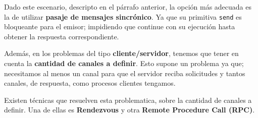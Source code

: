 \documentclass[a4paper, 10pt]{article}
\newenvironment{QandA}{
    \begin{enumerate}\bfseries}
    {\end{enumerate}
}
\newenvironment{answered}{\par\normalfont}{}
\begin{document}
\begin{QandA}
\begin{answered}
Dado este escenario, descripto en el párrafo anterior, la opción más adecuada es la de utilizar \textbf{pasaje de mensajes sincrónico}. Ya que su primitiva \lstinline{send} es bloqueante para el emisor; impidiendo que continue con su ejecución hasta obtener la respuesta correspondiente.

Además, en los problemas del tipo \textbf{cliente/servidor}, tenemos que tener en cuenta la \textbf{cantidad de canales a definir}. Esto supone un problema ya que; necesitamos al menos un canal para que el servidor reciba solicitudes y tantos canales, de respuesta, como procesos clientes tengamos. 

Existen técnicas que resuelven esta problematica, sobre la cantidad de canales a definir. Una de ellas es \textbf{Rendezvous} y otra \textbf{Remote Procedure Call (RPC)}.
\end{answered}
\end{QandA}
\end{document}
